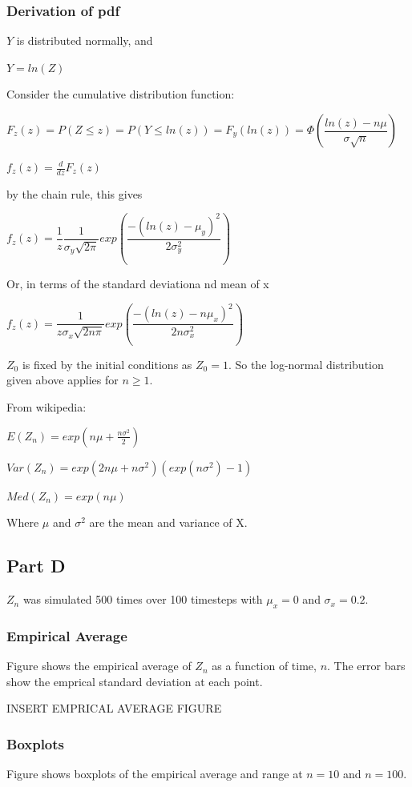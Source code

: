 \documentclass{article}
\begin{document}
\subsubsection{Derivation of pdf}

$Y$ is distributed normally, and

$Y = ln(Z)$

\bigskip

Consider the cumulative distribution function:


$F_z(z) = P(Z \leq z) = P(Y \leq ln(z)) = F_y(ln(z)) = \Phi(\dfrac{ln(z) - n\mu}{\sigma \sqrt{n}})$

$f_z(z) = \frac{d}{dz}F_z(z)$

by the chain rule, this gives

$f_z(z) = \dfrac{1}{z} \dfrac{1}{\sigma_y \sqrt{2\pi}}exp(\dfrac{-(ln(z)-\mu_y)^2}{2\sigma_y^2})$

Or, in terms of the standard deviationa nd mean of x

$f_z(z) = \dfrac{1}{z\sigma_x \sqrt{2n\pi}}exp(\dfrac{-(ln(z)-n\mu_x)^2}{2n\sigma_x^2})$

$Z_0$ is fixed by the initial conditions as $Z_0=1$. So the log-normal distribution given above applies for $n \geq 1$.

\bigskip

From wikipedia: 

$E(Z_n) = exp(n\mu + \frac{n\sigma^2}{2})$

$Var(Z_n) = exp(2n \mu + n\sigma^2)(exp(n\sigma^2)-1)$

$Med(Z_n) = exp(n\mu)$

Where $\mu$ and $\sigma^2$ are the mean and variance of X.

\subsection{Part D}
$Z_n$ was simulated 500 times over 100 timesteps with $\mu_x=0$ and $\sigma_x=0.2$. 

\subsubsection{Empirical Average}
Figure shows the empirical average of $Z_n$ as a function of time, $n$. The error bars show the emprical standard deviation at each point.

INSERT EMPRICAL AVERAGE FIGURE

\subsubsection{Boxplots}
Figure shows boxplots of the empirical average and range at $n=10$ and $n=100$. 
\end{document}
